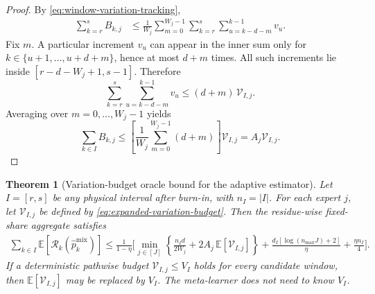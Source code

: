 \documentclass[11pt]{article}
\newtheorem{theorem}{Theorem}
\newcommand{\E}{\mathbb{E}}
\newcommand{\1}{\mathbf{1}}
\begin{document}
\begin{proof}
By \eqref{eq:window-variation-tracking},
\begin{align*}
    \sum_{k=r}^s B_{k,j}
    &\le
    \frac1{W_j}
    \sum_{m=0}^{W_j-1}
    \sum_{k=r}^s
    \sum_{u=k-d-m}^{k-1}v_u.
\end{align*}
Fix $m$.  A particular increment $v_u$ can appear in the inner sum only for
$k\in\{u+1,\ldots,u+d+m\}$, hence at most $d+m$ times.  All such increments
lie inside $[r-d-W_j+1,s-1]$.  Therefore
\[
    \sum_{k=r}^s
    \sum_{u=k-d-m}^{k-1}v_u
    \le
    (d+m)\,\mathcal V_{I,j}.
\]
Averaging over $m=0,\ldots,W_j-1$ yields
\[
    \sum_{k\in I}B_{k,j}
    \le
    \left[
        \frac1{W_j}\sum_{m=0}^{W_j-1}(d+m)
    \right]
    \mathcal V_{I,j}
    =
    A_j\mathcal V_{I,j}.
\]
\end{proof}

\begin{theorem}[Variation-budget oracle bound for the adaptive estimator]
\label{thm:variation-budget-oracle}
Let $I=[r,s]$ be any physical interval after burn-in, with $n_I=|I|$.
For each expert $j$, let $\mathcal V_{I,j}$ be defined by
\eqref{eq:expanded-variation-budget}.  Then the residue-wise fixed-share
aggregate satisfies
\begin{equation}
\boxed{
\begin{aligned}
    \sum_{k\in I}
    \E\!\left[
        \mathcal R_k(\widehat p_k^{\mathrm{mix}})
    \right]
    \le
    \frac1{1-\eta}
    \Bigg[
        \min_{j\in[J]}
        \left\{
            \frac{n_I d}{2W_j}
            +
            2A_j\,\E[\mathcal V_{I,j}]
        \right\}
        +
        \frac{d_I[\log(n_{\max}J)+2]}{\eta}
        +
        \frac{\eta n_I}{4}
    \Bigg].
\end{aligned}
}
\label{eq:variation-budget-oracle}
\end{equation}
If a deterministic pathwise budget
$\mathcal V_{I,j}\le V_I$ holds for every candidate window, then
$\E[\mathcal V_{I,j}]$ may be replaced by $V_I$.
The meta-learner does not need to know $V_I$.
\end{theorem}
\end{document}
